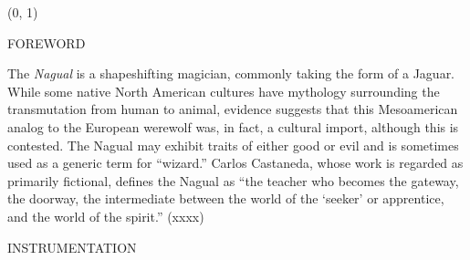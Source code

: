 \documentclass[11pt]{article}
\begin{document}
\begin{textblock}{23}(0, 1)
\begin{center}
\huge FOREWORD
\end{center}
\end{textblock}

\vspace*{0.25\baselineskip}

\begingroup
\begin{center}
The \textit{Nagual} is a shapeshifting magician, commonly taking the form of a Jaguar. While some native North American cultures have mythology surrounding the transmutation from human to animal, evidence suggests that this Mesoamerican analog to the European werewolf was, in fact, a cultural import, although this is contested. The Nagual may exhibit traits of either good or evil and is sometimes used as a generic term for ``wizard.'' Carlos Castaneda, whose work is regarded as primarily fictional, defines the Nagual as ``the teacher who becomes the gateway, the doorway, the intermediate between the world of the `seeker' or apprentice, and the world of the spirit.''
\rightskip\leftskip
\phantom{text} \hfill (xxxx)
\end{center}
\endgroup



\begin{center}
\huge INSTRUMENTATION
\end{center}
\end{document}
